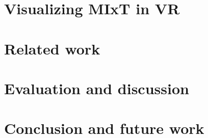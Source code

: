 \documentclass[USenglish]{uit-thesis}
\begin{document}
\chapter{Visualizing MIxT in VR}


\chapter{Related work}


\chapter{Evaluation and discussion}


\chapter{Conclusion and future work}


\printbibliography

% 

\backmatter
\end{document}
